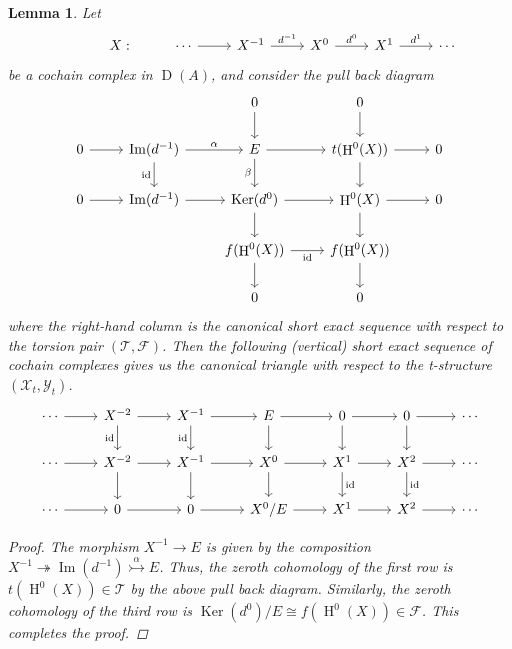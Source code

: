 \documentclass[12pt]{amsart}
\numberwithin{equation}{section}
\newtheorem{lemma}{Lemma}[section]
\theoremstyle{definition}
\DeclareMathOperator{\id}{id}
\DeclareMathOperator{\Ker}{Ker}
\DeclareMathOperator{\Imm}{Im}
\DeclareMathOperator{\D}{D}
\DeclareMathOperator{\HH}{H}
\newtheorem*{theorem 0*}{Theorem}
\newtheorem*{theorem a*}{Theorem A}
\newtheorem*{theorem b*}{Theorem B}
\newcounter{diagram}
\numberwithin{diagram}{section}
\begin{document}
	\begin{lemma}\label{2.18}
	Let
	\[\begin{tikzcd}
	{} & {X:} & \cdots & {X^{-1}} & {X^0} & {X^1} & \cdots
	\arrow[from=1-3, to=1-4]
	\arrow["{d^{-1}}", from=1-4, to=1-5]
	\arrow["{d^0}", from=1-5, to=1-6]
	\arrow["{d^1}", from=1-6, to=1-7]
\end{tikzcd}\]
	be a cochain complex in $\D(A)$, and consider the pull back diagram
	\[\begin{tikzcd}
	&& 0 & 0 & \\
	0 & {\Imm(d^{-1})} & E & {t(\HH^0(X))} & 0 \\
	0 & {\Imm(d^{-1})} & {\Ker(d^0)} & {\HH^0(X)} & 0 \\
	&& {f(\HH^0(X))} & {f(\HH^0(X))} \\
	&& 0 & 0
	\arrow[from=1-3, to=2-3]
	\arrow[from=1-4, to=2-4]
	\arrow[from=2-1, to=2-2]
	\arrow["\alpha", from=2-2, to=2-3]
	\arrow["\id"', from=2-2, to=3-2]
	\arrow[from=2-3, to=2-4]
	\arrow["\beta"', from=2-3, to=3-3]
	\arrow[from=2-4, to=2-5]
	\arrow[from=2-4, to=3-4]
	\arrow[from=3-1, to=3-2]
	\arrow[from=3-2, to=3-3]
	\arrow[from=3-3, to=3-4]
	\arrow[from=3-3, to=4-3]
	\arrow[from=3-4, to=3-5]
	\arrow[from=3-4, to=4-4]
	\arrow["\id"', from=4-3, to=4-4]
	\arrow[from=4-3, to=5-3]
	\arrow[from=4-4, to=5-4]
\end{tikzcd}\]
	where the right-hand column is the canonical short exact sequence with respect to the torsion pair $(\mathcal{T},\mathcal{F})$. Then the following (vertical) short exact sequence of cochain complexes gives us the canonical triangle with respect to the t-structure $(\mathcal{X}_t,\mathcal{Y}_t)$.
	\[\begin{tikzcd}
	\cdots & {X^{-2}} & {X^{-1}} & E & 0 & 0 & \cdots \\
	\cdots & {X^{-2}} & {X^{-1}} & {X^0} & {X^1} & {X^2} & \cdots \\
	\cdots & 0 & 0 & {X^0/E} & {X^1} & {X^2} & \cdots
	\arrow[from=1-1, to=1-2]
	\arrow[from=1-2, to=1-3]
	\arrow["\id"', from=1-2, to=2-2]
	\arrow[from=1-3, to=1-4]
	\arrow["\id"', from=1-3, to=2-3]
	\arrow[from=1-4, to=1-5]
	\arrow[from=1-4, to=2-4]
	\arrow[from=1-5, to=1-6]
	\arrow[from=1-5, to=2-5]
	\arrow[from=1-6, to=1-7]
	\arrow[from=1-6, to=2-6]
	\arrow[from=2-1, to=2-2]
	\arrow[from=2-2, to=2-3]
	\arrow[from=2-2, to=3-2]
	\arrow[from=2-3, to=2-4]
	\arrow[from=2-3, to=3-3]
	\arrow[from=2-4, to=2-5]
	\arrow[from=2-4, to=3-4]
	\arrow[from=2-5, to=2-6]
	\arrow["\id", from=2-5, to=3-5]
	\arrow[from=2-6, to=2-7]
	\arrow["\id", from=2-6, to=3-6]
	\arrow[from=3-1, to=3-2]
	\arrow[from=3-2, to=3-3]
	\arrow[from=3-3, to=3-4]
	\arrow[from=3-4, to=3-5]
	\arrow[from=3-5, to=3-6]
	\arrow[from=3-6, to=3-7]
\end{tikzcd}\]
\begin{proof}
The morphism $X^{-1}\rightarrow E$ is given by the composition $X^{-1}\twoheadrightarrow \Imm(d^{-1})\overset{\alpha}{\rightarrowtail}E$. Thus, the zeroth cohomology of the first row is $t(\HH^0(X))\in\mathcal{T}$ by the above pull back diagram. Similarly, the zeroth cohomology of the third row is $\Ker(d^0)/E\cong f(\HH^0(X))\in\mathcal{F}$. This completes the proof.
\end{proof}
	\end{lemma}
	
\end{document}

